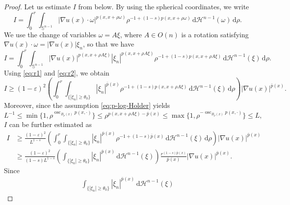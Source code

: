 \documentclass[11pt]{amsart}
\theoremstyle{plain}
\theoremstyle{definition}
\numberwithin{equation}{section}
\DeclareMathOperator{\osc}{osc}
\begin{document}
\begin{proof}
Let us estimate $I$ from below. By using the spherical coordinates, we write
\begin{equation*}
I = \int_{0}^{r} \int_{\mathbb{S}^{n-1}} |\nabla u(x) \cdot \omega|^{p(x, x+\rho \omega)} \rho^{-1+(1-s)p(x, x+\rho \omega)} \,\mathrm{d}\mathcal{H}^{n-1}(\omega) \,\mathrm{d}\rho.
\end{equation*}
We use the change of variables $\omega = A\xi$, where $A \in O(n)$ is a rotation satisfying $\nabla u(x) \cdot \omega = |\nabla u(x)| \xi_{n}$, so that we have
\begin{equation} \label{eq:I}
I = \int_{0}^{r} \int_{\mathbb{S}^{n-1}} |\nabla u(x)|^{p(x, x+\rho A\xi)} |\xi_{n}|^{p(x, x+\rho A \xi)} \rho^{-1+(1-s)p(x, x+\rho A\xi)} \,\mathrm{d}\mathcal{H}^{n-1}(\xi) \,\mathrm{d}\rho.
\end{equation}
Using \eqref{eq:r1} and \eqref{eq:r2}, we obtain
\begin{equation*}
I \geq (1-\varepsilon)^2 \left( \int_{0}^{r} \int_{\lbrace |\xi_{n}| \geq \theta_{0} \rbrace} |\xi_{n}|^{\bar{p}(x)} \rho^{-1+(1-s)p(x, x+\rho A\xi)} \,\mathrm{d}\mathcal{H}^{n-1}(\xi) \,\mathrm{d}\rho \right) |\nabla u(x)|^{\bar{p}(x)}.
\end{equation*}
Moreover, since the assumption \eqref{eq:p-log-Holder} yields
\begin{equation} \label{eq:log-Holder}
L^{-1} \leq \min\lbrace 1, \rho^{\osc_{B_{\rho}(x)}p(x, \cdot)} \rbrace \leq \rho^{p(x, x+\rho A\xi)-\bar{p}(x)} \leq \max\lbrace 1, \rho^{-\osc_{B_{\rho}(x)}p(x, \cdot)}\rbrace \leq L,
\end{equation}
$I$ can be further estimated as
\begin{equation*}
\begin{split}
I
&\geq \frac{(1-\varepsilon)^2}{L^{1-s}} \left( \int_{0}^{r} \int_{\lbrace |\xi_{n}| \geq \theta_{0} \rbrace} |\xi_{n}|^{\bar{p}(x)} \rho^{-1+(1-s) \bar{p}(x)} \,\mathrm{d}\mathcal{H}^{n-1}(\xi) \,\mathrm{d}\rho \right) |\nabla u(x)|^{\bar{p}(x)} \\
&\geq \frac{(1-\varepsilon)^2}{(1-s)L^{1-s}} \left( \int_{\lbrace |\xi_{n}| \geq \theta_{0} \rbrace} |\xi_{n}|^{\bar{p}(x)} \,\mathrm{d}\mathcal{H}^{n-1}(\xi) \right) \frac{r^{(1-s)\bar{p}(x)}}{\bar{p}(x)} |\nabla u(x)|^{\bar{p}(x)}.
\end{split}
\end{equation*}
Since
\begin{equation*}
\begin{split}
\int_{\lbrace |\xi_{n}| \geq \theta_{0} \rbrace} |\xi_{n}|^{\bar{p}(x)} \,\mathrm{d}\mathcal{H}^{n-1}(\xi)

\end{split}
\end{equation*}
\end{proof}
\end{document}
